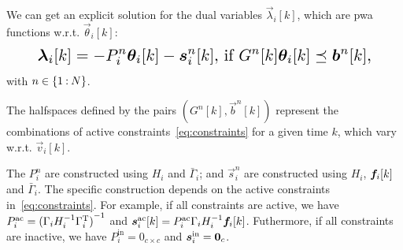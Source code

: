 \documentclass{ifacconf}  %
\begin{document}
We can get an explicit solution for the dual variables $\vec{\lambda}_{i}[k]$, which are \acrfull{pwa} functions w.r.t. $\vec{\theta}_{i}[k]$:
\begin{equation}
\resizebox{.88\columnwidth}{!}{$
  \begin{aligned}\label{eq:lambdafuntheta}
    \lambdaik=
      -P_{i}^{n}\thetaik-\vec{s}_{i}^{n}[k]\text{, if}\ G^{n}[k]\thetaik \preceq \vec{b}^{n}[k],
  \end{aligned}
  $}
\end{equation}
with $n\in\{1\mathbin{:} N\}$.

The halfspaces defined by the pairs $(G^{n}[k],\vec{b}^{n}[k])$ represent the combinations of active constraints~\eqref{eq:constraints} for a given time $k$, which vary w.r.t. $\vec{v}_{i}[k]$.

The $P_{i}^{n}$ are constructed using $H_{i}$ and $\bar{\Gamma}_{i}$; and $\vec{s}_{i}^{n}$ are constructed using $H_{i}$, $\fik$ and $\bar{\Gamma}_{i}$. The specific construction depends on the active constraints in~\eqref{eq:constraints}.
For example, if all constraints are active, we have ${P_{i}^{\text{ac}}={(\relax{\Gamma}_{i}H_{i}^{-1}\relax{\Gamma}_{i}^{\mathrm{T}})}^{-1}}$ and ${\vec{s}_{i}^{\text{ac}}[k]=P_{i}^{\text{ac}}\bar{\Gamma}_{i}H_{i}^{-1}\fik}$.
Futhermore, if all constraints are inactive, we have ${P_{i}^{\text{in}}=0_{c\times c}}$ and ${\boldsymbol{s}_{i}^{\text{in}}=\mathbf{0}_{c}}$.

\end{document}
